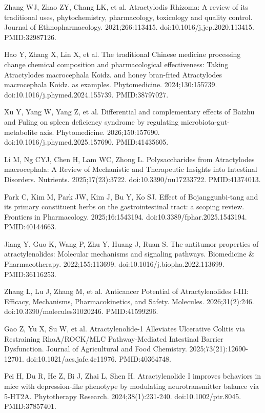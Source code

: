 \documentclass[12pt,oneside]{book}
\newcommand{\reff}[2]{\par\hangindent=7mm\hangafter=1\noindent[#1]\hspace{2mm}#2\par}
\begin{document}
\reff{3}{Zhang WJ, Zhao ZY, Chang LK, et al. Atractylodis Rhizoma: A review of its traditional uses, phytochemistry, pharmacology, toxicology and quality control. Journal of Ethnopharmacology. 2021;266:113415. doi:10.1016/j.jep.2020.113415. PMID:32987126.}

\reff{4}{Hao Y, Zhang X, Lin X, et al. The traditional Chinese medicine processing change chemical composition and pharmacological effectiveness: Taking Atractylodes macrocephala Koidz. and honey bran-fried Atractylodes macrocephala Koidz. as examples. Phytomedicine. 2024;130:155739. doi:10.1016/j.phymed.2024.155739. PMID:38797027.}

\reff{5}{Xu Y, Yang W, Yang Z, et al. Differential and complementary effects of Baizhu and Fuling on spleen deficiency syndrome by regulating microbiota-gut-metabolite axis. Phytomedicine. 2026;150:157690. doi:10.1016/j.phymed.2025.157690. PMID:41435605.}

\reff{6}{Li M, Ng CYJ, Chen H, Lam WC, Zhong L. Polysaccharides from Atractylodes macrocephala: A Review of Mechanistic and Therapeutic Insights into Intestinal Disorders. Nutrients. 2025;17(23):3722. doi:10.3390/nu17233722. PMID:41374013.}

\reff{7}{Park C, Kim M, Park JW, Kim J, Bu Y, Ko SJ. Effect of Bojanggunbi-tang and its primary constituent herbs on the gastrointestinal tract: a scoping review. Frontiers in Pharmacology. 2025;16:1543194. doi:10.3389/fphar.2025.1543194. PMID:40144663.}

\reff{8}{Jiang Y, Guo K, Wang P, Zhu Y, Huang J, Ruan S. The antitumor properties of atractylenolides: Molecular mechanisms and signaling pathways. Biomedicine \& Pharmacotherapy. 2022;155:113699. doi:10.1016/j.biopha.2022.113699. PMID:36116253.}

\reff{9}{Zhang L, Lu J, Zhang M, et al. Anticancer Potential of Atractylenolides I-III: Efficacy, Mechanisms, Pharmacokinetics, and Safety. Molecules. 2026;31(2):246. doi:10.3390/molecules31020246. PMID:41599296.}

\reff{10}{Gao Z, Yu X, Su W, et al. Atractylenolide-1 Alleviates Ulcerative Colitis via Restraining RhoA/ROCK/MLC Pathway-Mediated Intestinal Barrier Dysfunction. Journal of Agricultural and Food Chemistry. 2025;73(21):12690-12701. doi:10.1021/acs.jafc.4c11976. PMID:40364748.}

\reff{11}{Pei H, Du R, He Z, Bi J, Zhai L, Shen H. Atractylenolide I improves behaviors in mice with depression-like phenotype by modulating neurotransmitter balance via 5-HT2A. Phytotherapy Research. 2024;38(1):231-240. doi:10.1002/ptr.8045. PMID:37857401.}
\end{document}
